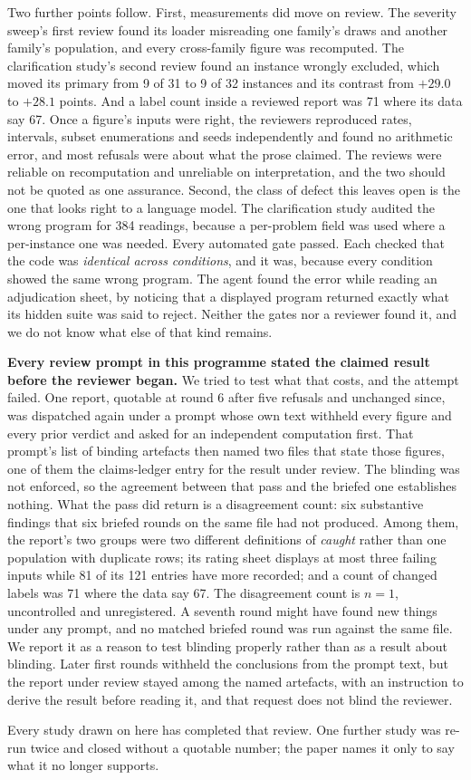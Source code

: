 Two further points follow. First, measurements did move on review. The severity sweep's first
review found its loader misreading one family's draws and another family's population, and every
cross-family figure was recomputed. The clarification study's second review found an instance
wrongly excluded, which moved its primary from 9 of 31 to 9 of 32 instances and its contrast from
$+29.0$ to $+28.1$ points. And a label count inside a reviewed report was 71 where its data say
67. Once a figure's inputs were right, the reviewers reproduced rates, intervals, subset
enumerations and seeds independently and found no arithmetic error, and most refusals were about
what the prose claimed. The reviews were reliable on recomputation and unreliable on interpretation,
and the two should not be quoted as one assurance. Second, the class of defect this leaves open is
the one that looks right to a language model. The clarification study audited the wrong program
for 384 readings, because a per-problem field was used where a per-instance one was needed. Every
automated gate passed. Each checked that the code was \emph{identical across conditions}, and it
was, because every condition showed the same wrong program. The agent found the error while
reading an adjudication sheet, by noticing that a displayed program returned exactly what its hidden suite was said to reject. Neither the
gates nor a reviewer found it, and we do not know what else of that kind remains.

\textbf{Every review prompt in this programme stated the claimed result before the reviewer
began.} We tried to test what that costs, and the attempt failed. One report, quotable at round 6
after five refusals and unchanged since, was dispatched again under a prompt whose own text
withheld every figure and every prior verdict and asked for an independent computation first.
That prompt's list of binding artefacts then named two files that state those figures, one of
them the claims-ledger entry for the result under review. The blinding was not enforced, so the
agreement between that pass and the briefed one establishes nothing. What the pass did return is a
disagreement count: six substantive findings that six briefed rounds on the same file had not
produced. Among them, the report's two groups were two different definitions of \emph{caught}
rather than one population with duplicate rows; its rating sheet displays at most three failing
inputs while 81 of its 121 entries have more recorded; and a count of changed labels was 71 where
the data say 67. The disagreement count is $n=1$, uncontrolled and unregistered. A seventh round might have found new things under any prompt, and no matched
briefed round was run against the same file. We report it as a reason to test blinding properly
rather than as a result about blinding. Later first rounds withheld the conclusions from the
prompt text, but the report under review stayed among the named artefacts, with an instruction to
derive the result before reading it, and that request does not blind the reviewer.

Every study drawn on here has completed that review. One further study was re-run twice and closed
without a quotable number; the paper names it only to say what it no longer supports.
